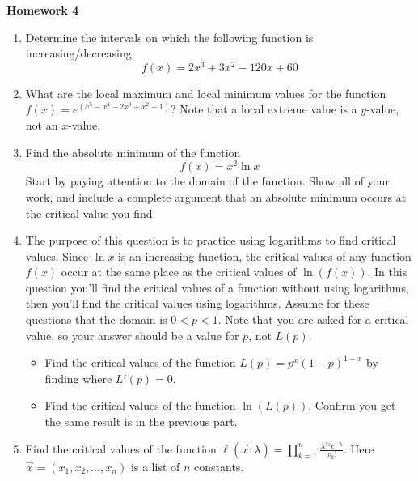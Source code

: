 \documentclass{article}
\begin{document}
 \begin{center}
    \large \textbf{Homework 4}
\end{center}
            \begin{enumerate}
                 \item Determine the intervals on which the following function is increasing/decreasing.  $$f(x)=2x^3+3x^2-120x+60$$
                 \item What are the local maximum and local minimum values for the function $f(x) = e^{(x^5-x^4-2x^3+x^2-1)}$? Note that a local extreme value is a $y$-value, not an $x$-value.
                \item Find the absolute minimum of the function 
                $$f(x) = x^2\ln{x}$$
                Start by paying attention to the domain of the function. Show all of your work, and include a complete argument that an absolute minimum occurs at the critical value you find.
                \item The purpose of this question is to practice using logarithms to find critical values. Since $\ln{x}$ is an increasing function, the critical values of any function $f(x)$ occur at the same place as the critical values of $\ln{(f(x))}$. In this question you'll find the critical values of a function without using logarithms, then you'll find the critical values using logarithms. Assume for these questions that the domain is $0 < p < 1$. Note that you are asked for a critical value, so your answer should be a value for $p$, not $L(p)$.
                \begin{itemize}
                    \item Find the critical values of the function $L(p) = p^x(1-p)^{1-x}$ by finding where $L'(p) = 0$.
                    \item Find the critical values of the function $\ln{(L(p))}$. Confirm you get the same result is in the previous part.
                \end{itemize} 
                \item Find the critical values of the function $\displaystyle \ell(\vec{x}:\lambda) = \prod_{k=1}^{n} \frac{\lambda^{x_k}e^{-\lambda}}{x_k!}$. Here $\vec{x}=(x_1,x_2,\dots,x_n)$ is a list of $n$ constants.
                
 





\end{enumerate}
\end{document}
